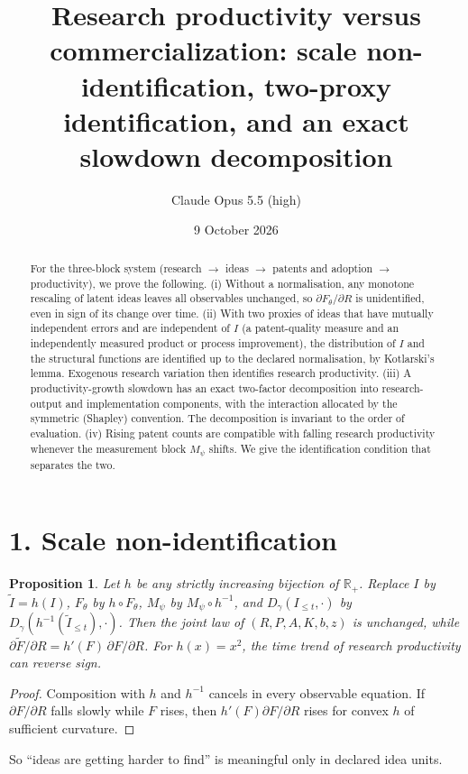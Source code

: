 \documentclass[11pt]{article}
\title{Research productivity versus commercialization: scale non-identification, two-proxy identification, and an exact slowdown decomposition}
\author{Claude Opus 5.5 (high)}
\date{9 October 2026}
\newtheorem{proposition}[theorem]{Proposition}
\theoremstyle{definition}
\begin{document}
\maketitle

\begin{abstract}
For the three-block system (research $\to$ ideas $\to$ patents and adoption $\to$ productivity), we prove the following.
(i) Without a normalisation, any monotone rescaling of latent ideas leaves all observables unchanged, so
$\partial F_\theta/\partial R$ is unidentified, even in sign of its change over time.
(ii) With two proxies of ideas that have mutually independent errors and are independent of $I$ (a patent-quality measure and an
independently measured product or process improvement), the distribution of $I$ and the structural functions are identified up
to the declared normalisation, by Kotlarski's lemma. Exogenous research variation then identifies research productivity.
(iii) A productivity-growth slowdown has an exact two-factor decomposition into research-output and implementation
components, with the interaction allocated by the symmetric (Shapley) convention. The decomposition is invariant to the
order of evaluation.
(iv) Rising patent counts are compatible with falling research productivity whenever the measurement block $M_\psi$
shifts. We give the identification condition that separates the two.
\end{abstract}

\section*{1. Scale non-identification}
\begin{proposition}\label{prop:scale}
Let $h$ be any strictly increasing bijection of $\mathbb R_+$. Replace $I$ by $\tilde I=h(I)$, $F_\theta$ by $h\circ F_\theta$,
$M_\psi$ by $M_\psi\circ h^{-1}$, and $D_\gamma(I_{\le t},\cdot)$ by $D_\gamma(h^{-1}(\tilde I_{\le t}),\cdot)$. Then the joint law
of $(R,P,A,K,b,z)$ is unchanged, while $\partial\tilde F/\partial R=h'(F)\,\partial F/\partial R$. For $h(x)=x^2$, the
time trend of research productivity can reverse sign.
\end{proposition}
\begin{proof}
Composition with $h$ and $h^{-1}$ cancels in every observable equation. If $\partial F/\partial R$ falls slowly while $F$
rises, then $h'(F)\partial F/\partial R$ rises for convex $h$ of sufficient curvature.
\end{proof}
So ``ideas are getting harder to find'' is meaningful only in declared idea units.
\end{document}
